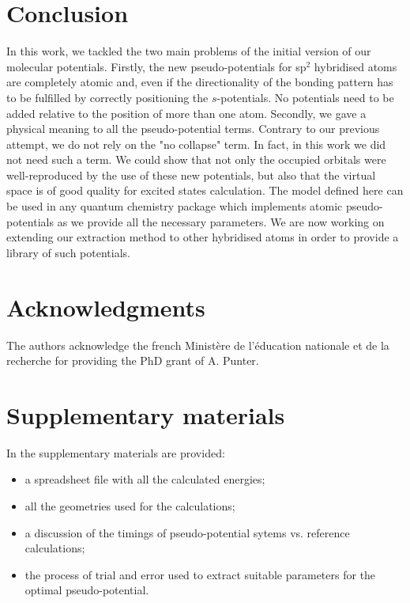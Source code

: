 \documentclass[aip]{revtex4-1}
\begin{document}
\section{Conclusion}
In this work, we tackled the two main problems of the initial version of our
molecular potentials.
Firstly, the new pseudo-potentials for sp$^2$ hybridised
atoms are completely atomic and, even if the directionality of the bonding pattern
has to be fulfilled by correctly positioning the \(s\)-potentials. No potentials need to
be added relative to the position of more than one atom.
Secondly, we gave a physical meaning to all the pseudo-potential
terms.
Contrary to our previous attempt, we do not rely on the "no collapse" term.
In fact, in this work we did not need such a term.
We could show that not only the occupied orbitals were well-reproduced
by the use of these new potentials, but also that the virtual space is of good quality
for excited states calculation.
The model defined here can be used in any quantum chemistry package which
implements atomic pseudo-potentials as we provide all the necessary parameters.
We are now working on extending our extraction method to other hybridised atoms
in order to provide a library of such potentials.

\section{Acknowledgments}
The authors acknowledge the french Minist\`ere de l'\'education
nationale et de la recherche for providing the PhD grant of A. Punter.

\section{Supplementary materials}
In the supplementary materials are provided:
\begin{itemize}
\item a spreadsheet file with all the calculated energies;
\item all the geometries used for the calculations;
\item a discussion of the timings of pseudo-potential sytems vs. reference
calculations;
\item the process of trial and error used to extract suitable parameters for
the optimal pseudo-potential.
\end{itemize}

\end{document}
